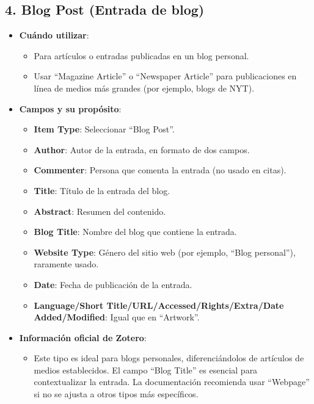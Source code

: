 \documentclass[
  jou,
  floatsintext,
  longtable,
  a4paper,
  nolmodern,
  notxfonts,
  notimes,
  colorlinks=true,linkcolor=blue,citecolor=blue,urlcolor=blue]{apa7}
\providecommand{\tightlist}{%
  \setlength{\itemsep}{0pt}\setlength{\parskip}{0pt}}
\begin{document}
\subsection{4. Blog Post (Entrada de
blog)}\label{blog-post-entrada-de-blog}

\begin{itemize}
\tightlist
\item
  \textbf{Cuándo utilizar}:

  \begin{itemize}
  \tightlist
  \item
    Para artículos o entradas publicadas en un blog personal.
  \item
    Usar ``Magazine Article'' o ``Newspaper Article'' para publicaciones
    en línea de medios más grandes (por ejemplo, blogs de NYT).
  \end{itemize}
\item
  \textbf{Campos y su propósito}:

  \begin{itemize}
  \tightlist
  \item
    \textbf{Item Type}: Seleccionar ``Blog Post''.
  \item
    \textbf{Author}: Autor de la entrada, en formato de dos campos.
  \item
    \textbf{Commenter}: Persona que comenta la entrada (no usado en
    citas).
  \item
    \textbf{Title}: Título de la entrada del blog.
  \item
    \textbf{Abstract}: Resumen del contenido.
  \item
    \textbf{Blog Title}: Nombre del blog que contiene la entrada.
  \item
    \textbf{Website Type}: Género del sitio web (por ejemplo, ``Blog
    personal''), raramente usado.
  \item
    \textbf{Date}: Fecha de publicación de la entrada.
  \item
    \textbf{Language/Short Title/URL/Accessed/Rights/Extra/Date
    Added/Modified}: Igual que en ``Artwork''.
  \end{itemize}
\item
  \textbf{Información oficial de Zotero}:

  \begin{itemize}
  \tightlist
  \item
    Este tipo es ideal para blogs personales, diferenciándolos de
    artículos de medios establecidos. El campo ``Blog Title'' es
    esencial para contextualizar la entrada. La documentación recomienda
    usar ``Webpage'' si no se ajusta a otros tipos más específicos.
  \end{itemize}
\end{itemize}
\end{document}
